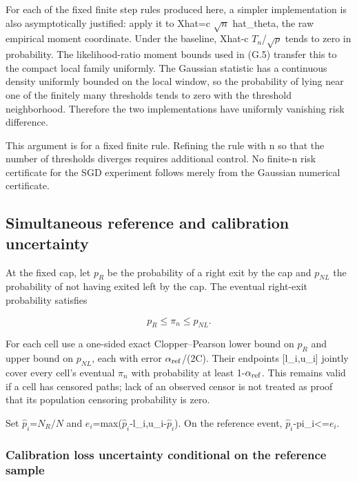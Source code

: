 For each of the fixed finite step rules produced here, a simpler implementation is also asymptotically justified: apply it to Xhat=c \(\sqrt n\) hat\_theta, the raw empirical moment coordinate. Under the baseline, Xhat-c \(T_n\)/\(\sqrt\rho\) tends to zero in probability. The likelihood-ratio moment bounds used in (G.5) transfer this to the compact local family uniformly. The Gaussian statistic has a continuous density uniformly bounded on the local window, so the probability of lying near one of the finitely many thresholds tends to zero with the threshold neighborhood. Therefore the two implementations have uniformly vanishing risk difference.

This argument is for a fixed finite rule. Refining the rule with n so that the number of thresholds diverges requires additional control. No finite-n risk certificate for the SGD experiment follows merely from the Gaussian numerical certificate.

\subsection{Simultaneous reference and calibration uncertainty}\label{simultaneous-reference-and-calibration-uncertainty}

At the fixed cap, let \(p_R\) be the probability of a right exit by the cap and \(p_{NL}\) the probability of not having exited left by the cap. The eventual right-exit probability satisfies

\[
p_R\le\pi_n\le p_{NL}.
\]

For each cell use a one-sided exact Clopper--Pearson lower bound on \(p_R\) and upper bound on \(p_{NL}\), each with error \(\alpha_{\rm ref}\)/(2C). Their endpoints {[}l\_i,u\_i{]} jointly cover every cell's eventual \(\pi_n\) with probability at least 1-\(\alpha_{\rm ref}\). This remains valid if a cell has censored paths; lack of an observed censor is not treated as proof that its population censoring probability is zero.

Set \(\widehat p_i\)=\(N_R/N\) and \(e_i\)=max(\(\widehat p_i\)-l\_i,u\_i-\(\widehat p_i\)). On the reference event, \textbar{}\(\widehat p_i\)-pi\_i\textbar\textless=\(e_i\).

\subsubsection{Calibration loss uncertainty conditional on the reference sample}\label{calibration-loss-uncertainty-conditional-on-the-reference-sample}

